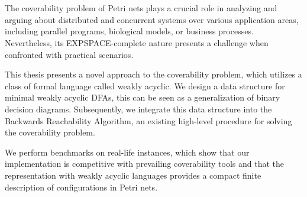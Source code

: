 \chapter{\abstractname}


The coverability problem of Petri nets plays a crucial role in analyzing and arguing about distributed and concurrent systems over various application areas, including parallel programs, biological models, or business processes. 
Nevertheless, its EXPSPACE-complete nature presents a challenge when confronted with practical scenarios. 

This thesis presents a novel approach to the coverability problem, which utilizes a class of formal language called weakly acyclic. We design a data structure for minimal weakly acyclic DFAs, this can be seen as a generalization of binary decision diagrams. Subsequently, we integrate this data structure into the Backwards Reachability Algorithm, an existing high-level procedure for solving the coverability problem. 

We perform benchmarks on real-life instances, which show that our implementation is competitive with prevailing coverability tools and that the representation with weakly acyclic languages provides a compact finite description of configurations in Petri nets. 